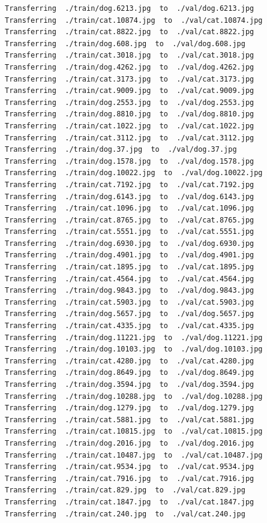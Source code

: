 \documentclass[]{book}
\theoremstyle{definition}
\theoremstyle{definition}
\theoremstyle{definition}
\theoremstyle{remark}
\begin{document}
\begin{verbatim}
Transferring  ./train/dog.6213.jpg  to  ./val/dog.6213.jpg
Transferring  ./train/cat.10874.jpg  to  ./val/cat.10874.jpg
Transferring  ./train/cat.8822.jpg  to  ./val/cat.8822.jpg
Transferring  ./train/dog.608.jpg  to  ./val/dog.608.jpg
Transferring  ./train/cat.3018.jpg  to  ./val/cat.3018.jpg
Transferring  ./train/dog.4262.jpg  to  ./val/dog.4262.jpg
Transferring  ./train/cat.3173.jpg  to  ./val/cat.3173.jpg
Transferring  ./train/cat.9009.jpg  to  ./val/cat.9009.jpg
Transferring  ./train/dog.2553.jpg  to  ./val/dog.2553.jpg
Transferring  ./train/dog.8810.jpg  to  ./val/dog.8810.jpg
Transferring  ./train/cat.1022.jpg  to  ./val/cat.1022.jpg
Transferring  ./train/cat.3112.jpg  to  ./val/cat.3112.jpg
Transferring  ./train/dog.37.jpg  to  ./val/dog.37.jpg
Transferring  ./train/dog.1578.jpg  to  ./val/dog.1578.jpg
Transferring  ./train/dog.10022.jpg  to  ./val/dog.10022.jpg
Transferring  ./train/cat.7192.jpg  to  ./val/cat.7192.jpg
Transferring  ./train/dog.6143.jpg  to  ./val/dog.6143.jpg
Transferring  ./train/cat.1096.jpg  to  ./val/cat.1096.jpg
Transferring  ./train/cat.8765.jpg  to  ./val/cat.8765.jpg
Transferring  ./train/cat.5551.jpg  to  ./val/cat.5551.jpg
Transferring  ./train/dog.6930.jpg  to  ./val/dog.6930.jpg
Transferring  ./train/dog.4901.jpg  to  ./val/dog.4901.jpg
Transferring  ./train/cat.1895.jpg  to  ./val/cat.1895.jpg
Transferring  ./train/cat.4564.jpg  to  ./val/cat.4564.jpg
Transferring  ./train/dog.9843.jpg  to  ./val/dog.9843.jpg
Transferring  ./train/cat.5903.jpg  to  ./val/cat.5903.jpg
Transferring  ./train/dog.5657.jpg  to  ./val/dog.5657.jpg
Transferring  ./train/cat.4335.jpg  to  ./val/cat.4335.jpg
Transferring  ./train/dog.11221.jpg  to  ./val/dog.11221.jpg
Transferring  ./train/dog.10103.jpg  to  ./val/dog.10103.jpg
Transferring  ./train/cat.4280.jpg  to  ./val/cat.4280.jpg
Transferring  ./train/dog.8649.jpg  to  ./val/dog.8649.jpg
Transferring  ./train/dog.3594.jpg  to  ./val/dog.3594.jpg
Transferring  ./train/dog.10288.jpg  to  ./val/dog.10288.jpg
Transferring  ./train/dog.1279.jpg  to  ./val/dog.1279.jpg
Transferring  ./train/cat.5881.jpg  to  ./val/cat.5881.jpg
Transferring  ./train/cat.10815.jpg  to  ./val/cat.10815.jpg
Transferring  ./train/dog.2016.jpg  to  ./val/dog.2016.jpg
Transferring  ./train/cat.10487.jpg  to  ./val/cat.10487.jpg
Transferring  ./train/cat.9534.jpg  to  ./val/cat.9534.jpg
Transferring  ./train/cat.7916.jpg  to  ./val/cat.7916.jpg
Transferring  ./train/cat.829.jpg  to  ./val/cat.829.jpg
Transferring  ./train/cat.1847.jpg  to  ./val/cat.1847.jpg
Transferring  ./train/cat.240.jpg  to  ./val/cat.240.jpg

\end{verbatim}
\end{document}
